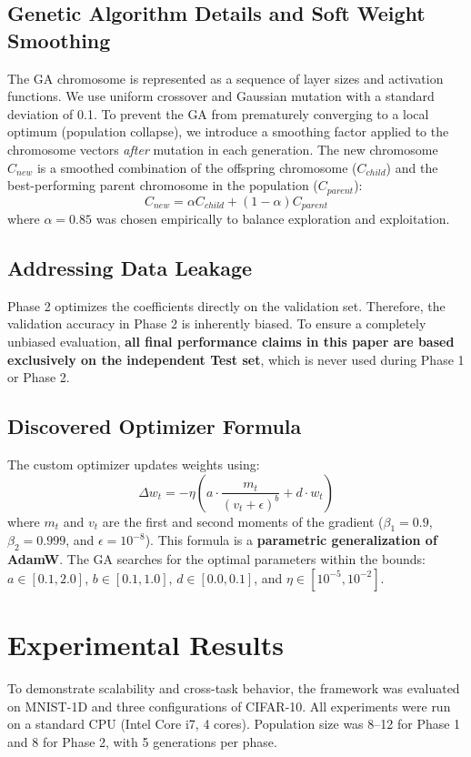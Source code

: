 \documentclass[preprint,12pt,review]{elsarticle}
\begin{document}
\subsection{Genetic Algorithm Details and Soft Weight Smoothing}
The GA chromosome is represented as a sequence of layer sizes and activation functions. We use uniform crossover and Gaussian mutation with a standard deviation of 0.1. 
To prevent the GA from prematurely converging to a local optimum (population collapse), we introduce a smoothing factor applied to the chromosome vectors \textit{after} mutation in each generation. The new chromosome \(C_{new}\) is a smoothed combination of the offspring chromosome (\(C_{child}\)) and the best-performing parent chromosome in the population (\(C_{parent}\)):
\begin{equation}
C_{new} = \alpha C_{child} + (1 - \alpha) C_{parent}
\end{equation}
where \(\alpha = 0.85\) was chosen empirically to balance exploration and exploitation.

\subsection{Addressing Data Leakage}
Phase 2 optimizes the coefficients directly on the validation set. Therefore, the validation accuracy in Phase 2 is inherently biased. To ensure a completely unbiased evaluation, \textbf{all final performance claims in this paper are based exclusively on the independent Test set}, which is never used during Phase 1 or Phase 2.

\subsection{Discovered Optimizer Formula}
The custom optimizer updates weights using:
\begin{equation}
\Delta w_t = - \eta \left( a \cdot \frac{m_t}{(v_t + \epsilon)^b} + d \cdot w_t \right)
\end{equation}
where \(m_t\) and \(v_t\) are the first and second moments of the gradient (\(\beta_1 = 0.9\), \(\beta_2 = 0.999\), and \(\epsilon = 10^{-8}\)). This formula is a \textbf{parametric generalization of AdamW}. The GA searches for the optimal parameters within the bounds: \(a \in [0.1, 2.0]\), \(b \in [0.1, 1.0]\), \(d \in [0.0, 0.1]\), and \(\eta \in [10^{-5}, 10^{-2}]\).

\section{Experimental Results}\label{sec3}
To demonstrate scalability and cross-task behavior, the framework was evaluated on MNIST-1D and three configurations of CIFAR-10. All experiments were run on a standard CPU (Intel Core i7, 4 cores). Population size was 8--12 for Phase 1 and 8 for Phase 2, with 5 generations per phase.
\end{document}
